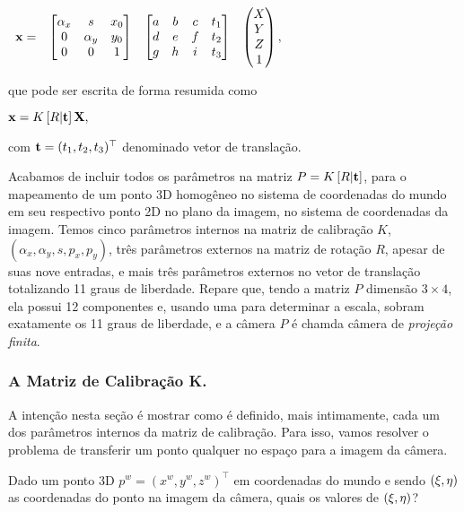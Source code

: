 \begin{center}
$
\begin{array}{cccc}
\mathbf{x}=
&
\begin{bmatrix}
\alpha_x&s&x_0\\
0&\alpha_y&y_0\\
0&0&1
\end{bmatrix}&
\begin{bmatrix}
a&b&c&t_1\\
d&e&f&t_2\\
g&h&i&t_3
\end{bmatrix}
&
\begin{pmatrix}
X\\
Y\\
Z\\
1
\end{pmatrix},
\end{array}
$
\end{center}
que pode ser escrita de forma resumida como

\begin{center}
$
\mathbf{x}=K\,[R|{\bf t}]\,\mathbf{X},
$
\end{center}
com ${\bf t}=(t_1,t_2,t_3)^\top$ denominado vetor de translação.

Acabamos de incluir todos os parâmetros na matriz $P=K\,[R|{\bf t}]$, para o mapeamento de um ponto 3D homogêneo no sistema de coordenadas do mundo em seu respectivo ponto 2D no plano da imagem, no sistema de coordenadas da imagem. Temos cinco parâmetros internos na matriz de calibração $K$, $(\alpha_x,\alpha_y,s,p_x,p_y)$, três parâmetros externos na matriz de rotação $R$, apesar de suas nove entradas, e mais três parâmetros externos no vetor de translação totalizando 11 graus de liberdade. Repare que, tendo a matriz $P$ dimensão $3\times4$, ela possui 12 componentes e, usando uma para determinar a escala, sobram exatamente os 11 graus de liberdade, e a câmera $P$ é chamda câmera de \textit{projeção finita}.

\subsubsection{A Matriz de Calibração K.}

A intenção nesta seção é mostrar como é definido, mais intimamente, cada um dos parâmetros internos da matriz de calibração. Para isso, vamos resolver o problema de transferir um ponto qualquer no espaço para a imagem da câmera.

Dado um ponto 3D $p^w = (x^w,y^w,z^w)^\top$ em coordenadas do mundo e sendo $(\xi,\eta)$ as coordenadas do ponto na imagem da câmera, quais os valores de $(\xi,\eta)$?

